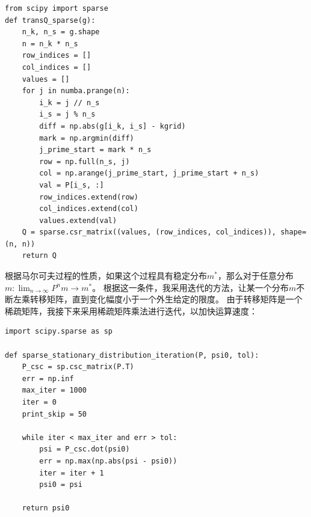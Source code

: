 \documentclass[a4paper, 12pt]{ctexart}
\begin{document}
\begin{lstlisting}
from scipy import sparse
def transQ_sparse(g):
    n_k, n_s = g.shape
    n = n_k * n_s
    row_indices = []
    col_indices = []
    values = []
    for j in numba.prange(n):
        i_k = j // n_s
        i_s = j % n_s
        diff = np.abs(g[i_k, i_s] - kgrid)
        mark = np.argmin(diff)
        j_prime_start = mark * n_s
        row = np.full(n_s, j)
        col = np.arange(j_prime_start, j_prime_start + n_s)
        val = P[i_s, :]
        row_indices.extend(row)
        col_indices.extend(col)
        values.extend(val)
    Q = sparse.csr_matrix((values, (row_indices, col_indices)), shape=(n, n))
    return Q
\end{lstlisting}

根据马尔可夫过程的性质，如果这个过程具有稳定分布$m^*$，那么对于任意分布$m:\lim_{n\to\infty}P^n m \to m^*$。
根据这一条件，我采用迭代的方法，让某一个分布$m$不断左乘转移矩阵，直到变化幅度小于一个外生给定的限度。
由于转移矩阵是一个稀疏矩阵，我接下来采用稀疏矩阵乘法进行迭代，以加快运算速度：
\begin{lstlisting}
import scipy.sparse as sp

def sparse_stationary_distribution_iteration(P, psi0, tol):
    P_csc = sp.csc_matrix(P.T)
    err = np.inf
    max_iter = 1000
    iter = 0
    print_skip = 50
    
    while iter < max_iter and err > tol:
        psi = P_csc.dot(psi0)
        err = np.max(np.abs(psi - psi0))
        iter = iter + 1
        psi0 = psi
        
    return psi0
\end{lstlisting}
\end{document}
